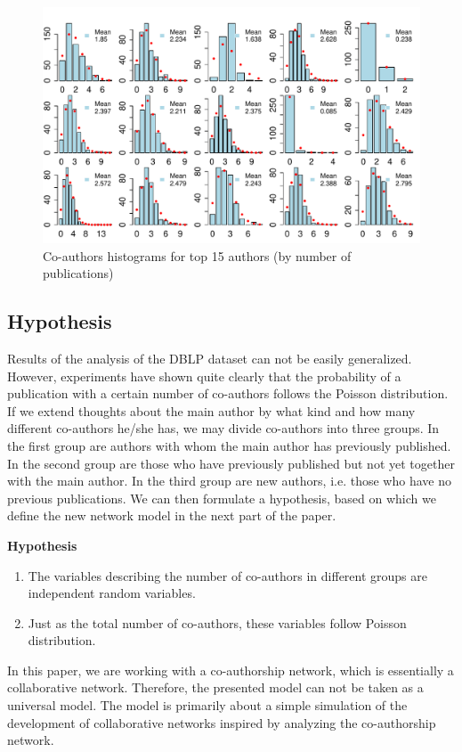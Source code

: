 \begin{figure}[ht]
\centering
\includegraphics[width=\linewidth]{figures/proactive_coauthors_top15}
  \caption{Co-authors histograms for top 15 authors (by number of publications)}
	\label{fig:top15}
\end{figure}

\subsection{Hypothesis}
Results of the analysis of the DBLP dataset can not be easily generalized. However, experiments have shown quite clearly that the probability of a publication with a certain number of co-authors follows the Poisson distribution. If we extend thoughts about the main author by what kind and how many different co-authors he/she has, we may divide co-authors into three groups. In the first group are authors with whom the main author has previously published. In the second group are those who have previously published but not yet together with the main author. In the third group are new authors, i.e. those who have no previous publications. We can then formulate a hypothesis, based on which we define the new network model in the next part of the paper.

\bigbreak
\textbf{Hypothesis}
\begin{enumerate}
	\item The variables describing the number of co-authors in different groups are independent random variables.
  \item Just as the total number of co-authors, these variables follow Poisson distribution.
\end{enumerate}

In this paper, we are working with a co-authorship network, which is essentially a collaborative network. Therefore, the presented model can not be taken as a universal model. The model is primarily about a simple simulation of the development of collaborative networks inspired by analyzing the co-authorship network.
